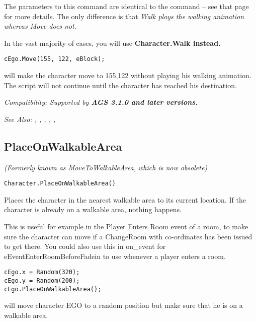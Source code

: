 The parameters to this command are identical to the 
command -- see that page for more details. The only difference is that \it{Walk}
plays the walking animation whereas \it{Move} does not.

In the vast majority of cases, you will use \bf{Character.Walk} instead.

\begin{verbatim}
cEgo.Move(155, 122, eBlock);
\end{verbatim}
will make the character move to 155,122 without playing his walking animation.
The script will not continue until the character has reached his destination.

\it{Compatibility:} Supported by \bf{AGS 3.1.0} and later versions.

\it{See Also:} ,
,
,
,
,


\subsection{PlaceOnWalkableArea}\label{Character.PlaceOnWalkableArea}%

\it{(Formerly known as MoveToWalkableArea, which is now obsolete)}

\begin{verbatim}
Character.PlaceOnWalkableArea()
\end{verbatim}
Places the character in the nearest walkable area to its current location.
If the character is already on a walkable area, nothing happens.

This is useful for example in the Player Enters Room event of a room, to
make sure the character can move if a ChangeRoom with co-ordinates has been issued to get there.
You could also use this in on_event for eEventEnterRoomBeforeFadein to use whenever a
player enters a room.

\begin{verbatim}
cEgo.x = Random(320);
cEgo.y = Random(200);
cEgo.PlaceOnWalkableArea();
\end{verbatim}
will move character EGO to a random position but make sure that he is on a walkable area.


